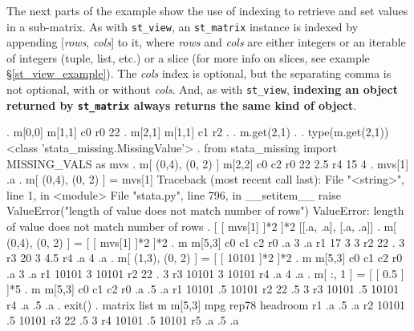 \documentclass{article}
\begin{document}
The next parts of the example show the use of indexing to retrieve and set values in a sub-matrix. As with \lstinline{st_view}, an \lstinline{st_matrix} instance is indexed by appending [\textit{rows}, \textit{cols}] to it, where \textit{rows} and \textit{cols} are either integers or an iterable of integers (tuple, list, etc.) or a slice (for more info on slices, see example \S\ref{st_view_example}). The \textit{cols} index is optional, but the separating comma is not optional, with or without \textit{cols}. And, as with \lstinline{st_view}, \textbf{indexing an object returned by \lstinline{st_matrix} always returns the same kind of object}.

\begin{stlog}
. m[0,0]
{\smallskip}
m[1,1]
           c0
r0         22
{\smallskip}
. m[2,1]
{\smallskip}
m[1,1]
           c1
r2          .
{\smallskip}
. m.get(2,1)
.
{\smallskip}
. type(m.get(2,1))
<class 'stata_missing.MissingValue'>
{\smallskip}
. from stata_missing import MISSING_VALS as mvs
{\smallskip}
. m[ (0,4), (0, 2) ]
{\smallskip}
m[2,2]
           c0         c2
r0         22        2.5
r4         15          4
{\smallskip}
. mvs[1]
.a
{\smallskip}
. m[ (0,4), (0, 2) ] = mvs[1]
{\color{red}Traceback (most recent call last):
  File "<string>", line 1, in <module>
  File "stata.py", line 796, in __setitem__
    raise ValueError("length of value does not match number of rows")
ValueError: length of value does not match number of rows}
{\smallskip}
. [ [ mvs[1] ]*2 ]*2
[[.a, .a], [.a, .a]]
{\smallskip}
. m[ (0,4), (0, 2) ] = [ [ mvs[1] ]*2 ]*2
{\smallskip}
. m
{\smallskip}
m[5,3]
           c0         c1         c2
r0         .a          3         .a
r1         17          3          3
r2         22          .          3
r3         20          3        4.5
r4         .a          4         .a
{\smallskip}
. m[ (1,3), (0, 2) ] = [ [ 10101 ]*2 ]*2
{\smallskip}
. m
{\smallskip}
m[5,3]
           c0         c1         c2
r0         .a          3         .a
r1      10101          3      10101
r2         22          .          3
r3      10101          3      10101
r4         .a          4         .a
{\smallskip}
. m[ :, 1 ] = [ [ 0.5 ] ]*5
{\smallskip}
. m
{\smallskip}
m[5,3]
           c0         c1         c2
r0         .a         .5         .a
r1      10101         .5      10101
r2         22         .5          3
r3      10101         .5      10101
r4         .a         .5         .a
{\smallskip}
. exit()
{\smallskip}
. matrix list m
{\smallskip}
m[5,3]
         mpg     rep78  headroom
r1        .a        .5        .a
r2     10101        .5     10101
r3        22        .5         3
r4     10101        .5     10101
r5        .a        .5        .a
{\smallskip}
\end{stlog}
\end{document}
